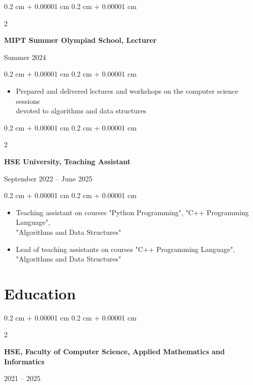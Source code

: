 \documentclass[10pt, letterpaper]{article}
\newenvironment{highlights}{
    \begin{itemize}[
        topsep=0.10 cm,
        parsep=0.10 cm,
        partopsep=0pt,
        itemsep=0pt,
        leftmargin=0.4 cm + 10pt
    ]
}{
    \end{itemize}
} %
\newenvironment{onecolentry}{
    \begin{adjustwidth}{
        0.2 cm + 0.00001 cm
    }{
        0.2 cm + 0.00001 cm
    }
}{
    \end{adjustwidth}
} %
\newenvironment{twocolentryED}[2][]{
    \onecolentry
    \def\secondColumn{#2}
    \setcolumnwidth{\fill, 4 cm}
    \begin{paracol}{2}
}{
    \switchcolumn \raggedleft \secondColumn
    \end{paracol}
    \endonecolentry
} %
\newenvironment{twocolentry}[2][]{
    \onecolentry
    \def\secondColumn{#2}
    \setcolumnwidth{\fill, 5 cm}
    \begin{paracol}{2}
}{
    \switchcolumn \raggedleft \secondColumn
    \end{paracol}
    \endonecolentry
} %
\begin{document}
        \vspace{0.3 cm}

        \begin{twocolentry}{
            
        {Summer 2024}}
            \textbf{MIPT Summer Olympiad School, Lecturer}
        \end{twocolentry}

        \vspace{0.10 cm}
        \begin{onecolentry}
            \begin{highlights}
                \item Prepared and delivered lectures and workshops on the computer science sessions \\ devoted to algorithms and data structures
            \end{highlights}
        \end{onecolentry}

        \vspace{0.2 cm}

        \begin{twocolentry}{
            
        {September 2022 – June 2025}}
            \textbf{HSE University, Teaching Assistant}
        \end{twocolentry}

        \vspace{0.10 cm}
        \begin{onecolentry}
            \begin{highlights}
                \item Teaching assistant on courses "Python Programming", "C++ Programming Language", \\ "Algorithms and Data Structures"
                \item Lead of teaching assistants on courses "C++ Programming Language", "Algorithms and Data Structures"
            \end{highlights}
        \end{onecolentry}
        

    \section{Education}

        \begin{twocolentryED}{
            
            
        {2021 – 2025}}
            \textbf{HSE, Faculty of Computer Science, Applied Mathematics and Informatics}
        \end{twocolentryED}
\end{document}
